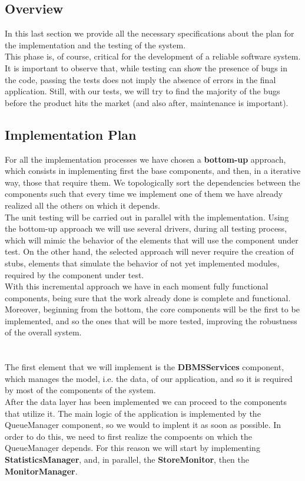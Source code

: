 \subsection{Overview}
In this last section we provide all the necessary specifications about the plan for the implementation and the testing of the system.\\ This phase is, of course, critical for the development of a reliable software system. It is important to observe that, while testing can show the presence of bugs in the code, passing the tests does not imply the absence of errors in the final application. Still, with our tests, we will try to find the majority of the bugs before the product hits the market (and also after, maintenance is important).

\subsection{Implementation Plan}
For all the implementation processes we have chosen a \textbf{bottom-up} approach, which consists in implementing first the base components, and then, in a iterative way, those that require them. We topologically sort the dependencies between the components such that every time we implement one of them we have already realized all the others on which it depends.\\
The unit testing will be carried out in parallel with the implementation. Using the bottom-up approach we will use several drivers, during all testing process, which will mimic the behavior of the elements that will use the component under test. On the other hand, the selected approach will never require the creation of stubs, elements that simulate the behavior of not yet implemented modules, required by the component under test.\\
With this incremental approach we have in each moment fully functional components, being sure that the work already done is complete and functional. Moreover, beginning from the bottom, the core components will be the first to be implemented, and so the ones that will be more tested, improving the robustness of the overall system.\\\\\\
The first element that we will implement is the \textbf{DBMSServices} component, which manages the model, i.e. the data, of our application, and so it is required by most of the components of the system.\\
After the data layer has been implemented we can proceed to the components that utilize it. The main logic of the application is implemented by the QueueManager component, so we would to implent it as soon as possible. In order to do this, we need to first realize the compoents on which the QueueManager depends. For this reason we will start by implementing \textbf{StatisticsManager}, and, in parallel, the \textbf{StoreMonitor}, then the \textbf{MonitorManager}.\\\\
